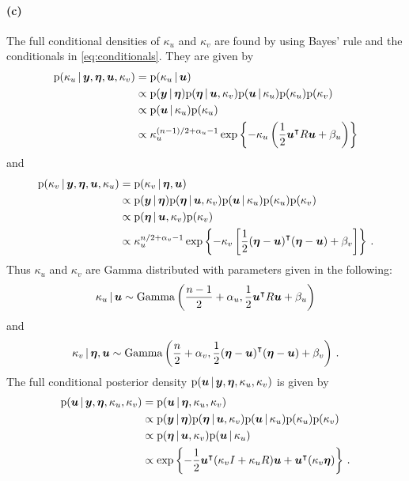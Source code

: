 \paragraph{(c)}
The full conditional densities of $\kappa_u$ and $\kappa_v$ are found by using Bayes' rule and the conditionals in \eqref{eq:conditionals}. They are given by
%
\begin{align*}
    \mathrm{p}(\kappa_u \, | \, \bm{y}, \bm{\eta}, \bm{u}, \kappa_v) &= \mathrm{p}(\kappa_u \, | \, \bm{u}) \\
    &\propto \mathrm{p}(\bm{y} \, | \, \bm{\eta}) \mathrm{p}(\bm{\eta} \, | \, \bm{u}, \kappa_v) \mathrm{p}(\bm{\bm{u}} \, | \, \kappa_u) \mathrm{p}(\kappa_u) \mathrm{p}(\kappa_v) \\
    &\propto \mathrm{p}(\bm{\bm{u}} \, | \, \kappa_u) \mathrm{p}(\kappa_u) \\
    &\propto \kappa_u^{(n-1)/2 + \alpha_u - 1} \exp \left\{-\kappa_u \left(\frac{1}{2} {\bm{u}}^\intercal R \bm{u} + \beta_u \right)\right\}
\end{align*}
%
and
%
\begin{align*}
    \mathrm{p}(\kappa_v \, | \, \bm{y}, \bm{\eta}, \bm{u}, \kappa_u) &= \mathrm{p}(\kappa_v \, | \, \bm{\eta}, \bm{u}) \\
    &\propto \mathrm{p}(\bm{y} \, | \, \bm{\eta}) \mathrm{p}(\bm{\eta} \, | \, \bm{u}, \kappa_v) \mathrm{p}(\bm{\bm{u}} \, | \, \kappa_u) \mathrm{p}(\kappa_u) \mathrm{p}(\kappa_v) \\
    &\propto \mathrm{p}(\bm{\eta} \, | \, \bm{u}, \kappa_v) \mathrm{p}(\kappa_v) \\
    &\propto \kappa_u^{n/2 + \alpha_v - 1} \exp \left\{-\kappa_v\left[\frac{1}{2} {(\bm{\eta}-\bm{u})}^\intercal(\bm{\eta}-\bm{u}) + \beta_v \right]\right\} \, .
\end{align*}
%
Thus $\kappa_u$ and $\kappa_v$ are Gamma distributed with parameters given in the following:
%
\begin{equation*}
    \kappa_u \, | \, \bm{u} \sim \mathrm{Gamma} \left(\frac{n-1}{2} + \alpha_u, \frac{1}{2} {\bm{u}}^\intercal R \bm{u} + \beta_u \right)
\end{equation*}
%
and
%
\begin{equation*}
    \kappa_v \, | \, \bm{\eta}, \bm{u} \sim \mathrm{Gamma} \left(\frac{n}{2} + \alpha_v, \frac{1}{2}{(\bm{\eta}-\bm{u})}^\intercal(\bm{\eta}-\bm{u}) + \beta_v \right) \, .
\end{equation*}
%
The full conditional posterior density $\mathrm{p}(\bm{u} \, | \, \bm{y}, \bm{\eta}, \kappa_u, \kappa_v)$ is given by
%
\begin{align*}
    \mathrm{p}(\bm{u} \, | \, \bm{y}, \bm{\eta}, \kappa_u, \kappa_v) &= \mathrm{p}(\bm{u} \, | \, \bm{\eta}, \kappa_u, \kappa_v) \\
    &\propto \mathrm{p}(\bm{y} \, | \, \bm{\eta}) \mathrm{p}(\bm{\eta} \, | \, \bm{u}, \kappa_v) \mathrm{p}(\bm{\bm{u}} \, | \, \kappa_u) \mathrm{p}(\kappa_u) \mathrm{p}(\kappa_v) \\
    &\propto \mathrm{p}(\bm{\eta} \, | \, \bm{u}, \kappa_v) \mathrm{p}(\bm{\bm{u}} \, | \, \kappa_u) \\
    &\propto \exp \left\{-\frac{1}{2} {\bm{u}}^\intercal(\kappa_v I + \kappa_u R) \bm{u} + {\bm{u}}^\intercal (\kappa_v \bm{\eta})\right\} \, .
\end{align*}

